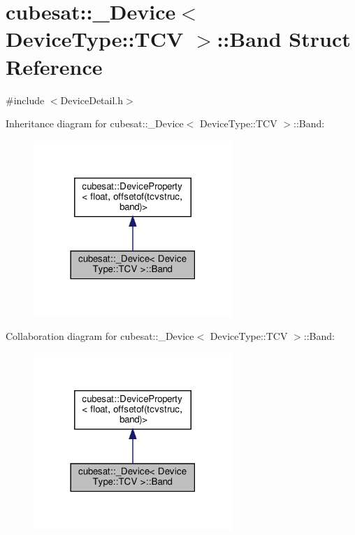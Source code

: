 \hypertarget{structcubesat_1_1__Device_3_01DeviceType_1_1TCV_01_4_1_1Band}{}\section{cubesat\+:\+:\+\_\+\+Device$<$ Device\+Type\+:\+:T\+CV $>$\+:\+:Band Struct Reference}
\label{structcubesat_1_1__Device_3_01DeviceType_1_1TCV_01_4_1_1Band}


{\ttfamily \#include $<$Device\+Detail.\+h$>$}



Inheritance diagram for cubesat\+:\+:\+\_\+\+Device$<$ Device\+Type\+:\+:T\+CV $>$\+:\+:Band\+:\nopagebreak
\begin{figure}[H]
\begin{center}
\leavevmode
\includegraphics[width=213pt]{structcubesat_1_1__Device_3_01DeviceType_1_1TCV_01_4_1_1Band__inherit__graph}
\end{center}
\end{figure}


Collaboration diagram for cubesat\+:\+:\+\_\+\+Device$<$ Device\+Type\+:\+:T\+CV $>$\+:\+:Band\+:\nopagebreak
\begin{figure}[H]
\begin{center}
\leavevmode
\includegraphics[width=213pt]{structcubesat_1_1__Device_3_01DeviceType_1_1TCV_01_4_1_1Band__coll__graph}
\end{center}
\end{figure}

